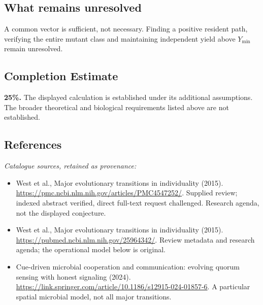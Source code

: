 \documentclass[11pt]{article}
\begin{document}
\subsection{What remains unresolved}
A common vector is sufficient, not necessary. Finding a positive resident path, verifying the entire mutant class and maintaining independent yield above $Y_{\min}$ remain unresolved.
\subsection{Completion Estimate}
\textbf{25\%.} The displayed calculation is established under its additional assumptions. The broader theoretical and biological requirements listed above are not established.
\subsection{References}
\noindent\emph{Catalogue sources, retained as provenance:}
\begin{itemize}
\item West et al., Major evolutionary transitions in individuality (2015). \url{https://pmc.ncbi.nlm.nih.gov/articles/PMC4547252/}. Supplied review; indexed abstract verified, direct full-text request challenged. Research agenda, not the displayed conjecture.
\item West et al., Major evolutionary transitions in individuality (2015). \url{https://pubmed.ncbi.nlm.nih.gov/25964342/}. Review metadata and research agenda; the operational model below is original.
\item Cue-driven microbial cooperation and communication: evolving quorum sensing with honest signaling (2024). \url{https://link.springer.com/article/10.1186/s12915-024-01857-6}. A particular spatial microbial model, not all major transitions.
\end{itemize}
\clearpage


\appendix
\end{document}
